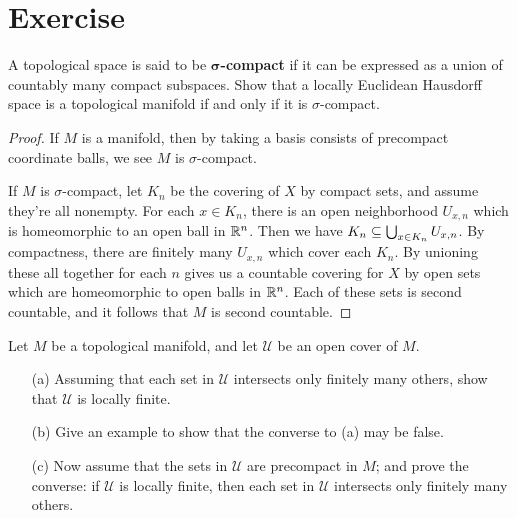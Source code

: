 \section{Exercise}
\begin{exercise}\label{mani iff sigma-compact}
A topological space is said to be \textbf{$\bm{\sigma}$-compact} if it can be expressed as a union of countably many compact subspaces. Show that a locally Euclidean Hausdorff space is a topological manifold if and only if it is $\sigma$-compact.
\end{exercise}
\begin{proof}
If $M$ is a manifold, then by taking a basis consists of precompact coordinate balls, we see $M$ is $\sigma$-compact.\par
If $M$ is $\sigma$-compact, let $K_n$ be the covering of $X$ by compact sets, and assume they're all nonempty. For each $x\in K_n$, there is an open neighborhood $U_{x,n}$ which is homeomorphic to an open ball in $\mathbb{R}^n$. Then we have $K_n\subseteq\bigcup_{x\in K_n}U_{x,n}$. By compactness, there are finitely many $U_{x,n}$ which cover each $K_n$. By unioning these all together for each $n$ gives us a countable covering for $X$ by open sets which are homeomorphic to open balls in $\mathbb{R}^n$. Each of these sets is second countable, and it follows that $M$ is second countable.
\end{proof}
\begin{exercise}
Let $M$ be a topological manifold, and let $\mathcal{U}$ be an open cover of $M$.
\begin{itemize}
\item[(a)]Assuming that each set in $\mathcal{U}$ intersects only finitely many others, show that $\mathcal{U}$ is locally finite.
\item[(b)]Give an example to show that the converse to (a) may be false.
\item[(c)]Now assume that the sets in $\mathcal{U}$ are precompact in $M$; and prove the converse: if $\mathcal{U}$ is locally finite, then each set in $\mathcal{U}$ intersects only finitely many others.
\end{itemize}
\end{exercise}
